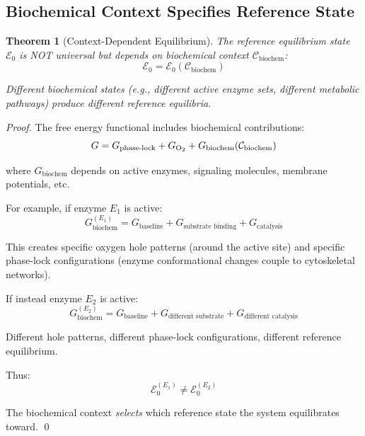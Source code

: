\documentclass[12pt,a4paper]{article}
\newtheorem{theorem}{Theorem}
\begin{document}
\subsection{Biochemical Context Specifies Reference State}

\begin{theorem}[Context-Dependent Equilibrium]
\label{thm:context_equilibrium}
The reference equilibrium state $\mathcal{E}_0$ is NOT universal but depends on biochemical context $\mathcal{C}_{\text{biochem}}$:
\begin{equation}
\mathcal{E}_0 = \mathcal{E}_0(\mathcal{C}_{\text{biochem}})
\end{equation}

Different biochemical states (e.g., different active enzyme sets, different metabolic pathways) produce different reference equilibria.
\end{theorem}

\begin{proof}
The free energy functional includes biochemical contributions:
\begin{equation}
G = G_{\text{phase-lock}} + G_{\ce{O2}} + G_{\text{biochem}}(\mathcal{C}_{\text{biochem}})
\end{equation}

where $G_{\text{biochem}}$ depends on active enzymes, signaling molecules, membrane potentials, etc.

For example, if enzyme $E_1$ is active:
\begin{equation}
G_{\text{biochem}}^{(E_1)} = G_{\text{baseline}} + G_{\text{substrate binding}} + G_{\text{catalysis}}
\end{equation}

This creates specific oxygen hole patterns (around the active site) and specific phase-lock configurations (enzyme conformational changes couple to cytoskeletal networks).

If instead enzyme $E_2$ is active:
\begin{equation}
G_{\text{biochem}}^{(E_2)} = G_{\text{baseline}} + G_{\text{different substrate}} + G_{\text{different catalysis}}
\end{equation}

Different hole patterns, different phase-lock configurations, different reference equilibrium.

Thus:
\begin{equation}
\mathcal{E}_0^{(E_1)} \neq \mathcal{E}_0^{(E_2)}
\end{equation}

The biochemical context \textit{selects} which reference state the system equilibrates toward. \qed
\end{proof}
\end{document}

